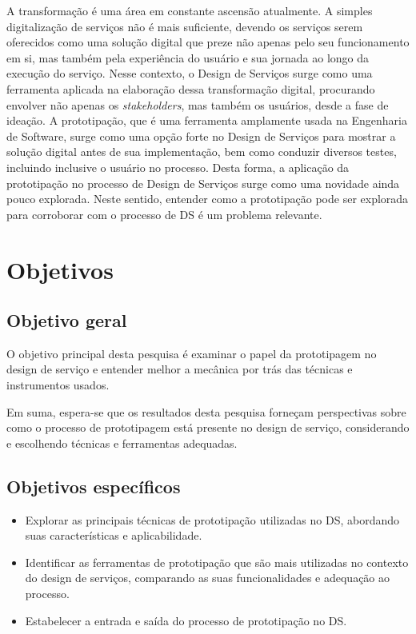 A transformação é uma área em constante ascensão atualmente. A simples digitalização de serviços não é mais suficiente, devendo os serviços serem oferecidos como uma solução digital que preze não apenas pelo seu funcionamento em si, mas também pela experiência do usuário e sua jornada ao longo da execução do serviço. Nesse contexto, o Design de Serviços surge como uma ferramenta aplicada na elaboração dessa transformação digital, procurando envolver não apenas os \textit{stakeholders}, mas também os usuários, desde a fase de ideação. A prototipação, que é uma ferramenta amplamente usada na Engenharia de Software, surge como uma opção forte no Design de Serviços para mostrar a solução digital antes de sua implementação, bem como conduzir diversos testes, incluindo inclusive o usuário no processo. Desta forma, a aplicação da prototipação no processo de Design de Serviços surge como uma novidade ainda pouco explorada. Neste sentido, entender como a prototipação pode ser explorada para corroborar com o processo de DS é um problema relevante.

\section {Objetivos}
\subsection{Objetivo geral}

O objetivo principal desta pesquisa é examinar o papel da prototipagem no design de serviço e entender melhor a mecânica por trás das técnicas e instrumentos usados.

Em suma, espera-se que os resultados desta pesquisa forneçam perspectivas sobre como o processo de prototipagem está presente no design de serviço, considerando e escolhendo técnicas e ferramentas adequadas.

\subsection{Objetivos específicos}

\begin{itemize}
	\item Explorar as principais técnicas de prototipação utilizadas no DS, abordando suas características e aplicabilidade.
	
	\item Identificar as ferramentas de prototipação que são mais utilizadas no contexto do design de serviços, comparando as suas funcionalidades e adequação ao processo.
	
	\item Estabelecer a entrada e saída do processo de prototipação no DS.%
\end{itemize}

